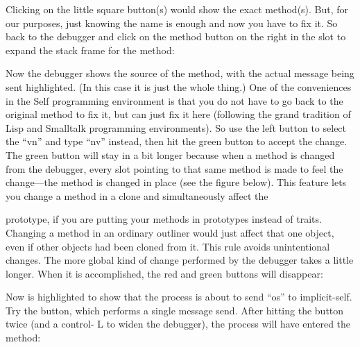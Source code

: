 \documentclass[letterpaper,10pt,english]{sphinxmanual}
\begin{document}

Clicking on the little square button(s) would show the exact method(s). But, for our purposes, just
knowing the name is enough and now you have to fix it. So back to the debugger and click on the
method button on the right in the  slot to expand the stack frame for the  method:
\begin{figure}[htbp]
\centering

\noindent{}
\end{figure}

Now the debugger shows the source of the method, with the actual message being sent highlighted.
(In this case it is just the whole thing.) One of the conveniences in the Self programming environment
is that you do not have to go back to the original method to fix it, but can just fix it here (following
the grand tradition of Lisp and Smalltalk programming environments). So use the left
button to select the “vn” and type “nv” instead, then hit the green button to accept the change. The
green button will stay in a bit longer because when a method is changed from the debugger, every
slot pointing to that same method is made to feel the change—the method is changed in place (see
the figure below). This feature lets you change a method in a clone and simultaneously affect the
\label{\detokenize{howtoprg:figprototype}}

prototype, if you are putting your methods in prototypes instead of traits. Changing a method in an
ordinary outliner would just affect that one object, even if other objects had been cloned from it.
This rule avoids unintentional changes. The more global kind of change performed by the debugger
takes a little longer. When it is accomplished, the red and green buttons will disappear:


Now  is highlighted to show that the process is about to send “os” to implicit-self. Try the 
button, which performs a single message send. After hitting the  button twice (and a control-
L to widen the debugger), the process will have entered the  method:
\end{document}
